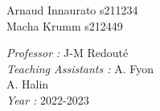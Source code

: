 \begin{titlepage}
\begin{minipage}{0.45\linewidth}
\begin{flushleft}
        Arnaud Innaurato  s211234 \\
        Macha Krumm  s212449
      \end{flushleft}
\end{minipage}
\hfill
\begin{minipage}{0.35\linewidth}
      \begin{flushleft} \large
        \emph{Professor : } J-M Redouté \\
        \emph{Teaching Assistants : } A. Fyon \\  A. Halin \\ 
        \emph{Year : } 2022-2023 
      \end{flushleft}
\end{minipage}

\end{titlepage}
